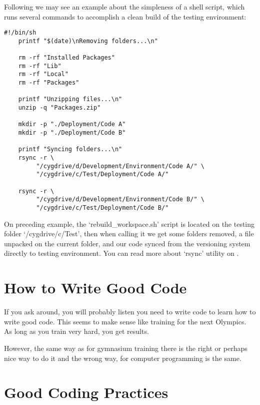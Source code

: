 \begin{englishtext}
    Following we may see an example about the simpleness of a shell script,
    which runs several commands to accomplish a clean build of the testing
    environment:

    \begin{lstlisting}[caption={rebuild\_workspace.sh}]
    #!/bin/sh
    printf "$(date)\nRemoving folders...\n"

    rm -rf "Installed Packages"
    rm -rf "Lib"
    rm -rf "Local"
    rm -rf "Packages"

    printf "Unzipping files...\n"
    unzip -q "Packages.zip"

    mkdir -p "./Deployment/Code A"
    mkdir -p "./Deployment/Code B"

    printf "Syncing folders...\n"
    rsync -r \
         "/cygdrive/d/Development/Environment/Code A/" \
         "/cygdrive/c/Test/Deployment/Code A/"

    rsync -r \
         "/cygdrive/d/Development/Environment/Code B/" \
         "/cygdrive/c/Test/Deployment/Code B/"
    \end{lstlisting}
    \vspace*{-4mm}

    On preceding example, the `rebuild\_workspace.sh' script is located on the
    testing folder `/cygdrive/c/Test', then when calling it we get some folders
    removed, a file unpacked on the current folder, and our code synced from the
    versioning system directly to testing environment. You can read more about
    `rsync' utility on \citeonline{synchronizingFolders}.



    \section{How to Write Good Code}

    If you ask around, you will probably listen you need to write code to learn
    how to write good code. This seems to make sense like training for the next
    Olympics. As long as you train very hard, you get results.

    However, the same way as for gymnasium training there is the right or
    perhaps nice way to do it and the wrong way, for computer programming is the
    same.


    \section{Good Coding Practices}



\end{englishtext}
